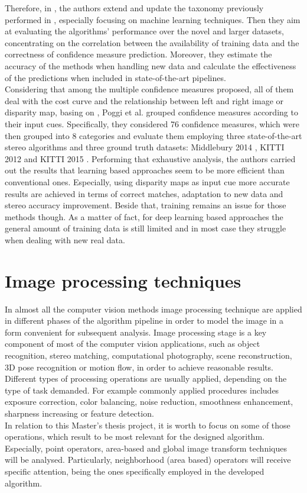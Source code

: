Therefore, in \cite{Poggi2017}, the authors extend and update the taxonomy previously performed in \cite{Hu2012}, especially focusing on machine learning techniques.
Then they aim at evaluating the algorithms' performance over the novel and larger datasets, concentrating on the correlation between the availability of training data and the correctness of confidence measure prediction. 
Moreover, they estimate the accuracy of the methods when handling new data and calculate the effectiveness of the predictions when included in state-of-the-art pipelines.\\
Considering that among the multiple confidence measures proposed, all of them deal with the cost curve and the relationship between left and right image or disparity map, basing on \cite{Hu2012}, Poggi et al. \cite{Poggi2017} grouped confidence measures according to their input cues. 
Specifically, they considered 76 confidence measures, which were then grouped into 8 categories and evaluate them employing three state-of-the-art stereo algorithms and three ground truth datasets: Middlebury 2014 \cite{Scharstein2014}, KITTI 2012 \cite{geiger2013vision} and KITTI 2015 \cite{menze2015object}.
Performing that exhaustive analysis, the authors carried out the results that learning based approaches seem to be more efficient than conventional ones. 
Especially, using disparity maps as input cue more accurate results are achieved in terms of correct matches, adaptation to new data and stereo accuracy improvement. 
Beside that, training remains an issue for those methods though. 
As a matter of fact, for deep learning based approaches the general amount of training data is still limited and in most case they struggle when dealing with new real data.\\

\section{Image processing techniques}
\label{section:image-proc-technique}

In almost all the computer vision methods image processing technique are applied in different phases of the algorithm pipeline in order to model the image in a form convenient for subsequent analysis. 
Image processing stage is a key component of most of the computer vision applications, such as object recognition, stereo matching, computational photography, scene reconstruction, 3D pose recognition or motion flow, in order to achieve reasonable results. 
Different types of processing operations are usually applied, depending on the type of task demanded.
For example commonly applied procedures includes exposure correction, color balancing, noise reduction, smoothness enhancement, sharpness increasing or feature detection.\\
In relation to this Master's thesis project, it is worth to focus on some of those operations, which result to be most relevant for the designed algorithm. 
Especially, point operators, area-based and global image transform techniques will be analysed. 
Particularly, neighborhood (area based) operators will receive specific attention, being the ones specifically employed in the developed algorithm. \\

